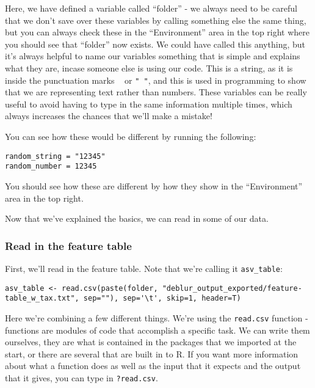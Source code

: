 \documentclass[
]{book}
\begin{document}
Here, we have defined a variable called ``folder'' - we always need to be careful that we don't save over these variables by calling something else the same thing, but you can always check these in the ``Environment'' area in the top right where you should see that ``folder'' now exists. We could have called this anything, but it's always helpful to name our variables something that is simple and explains what they are, incase someone else is using our code. This is a string, as it is inside the punctuation marks \texttt{\textquotesingle{}\ \textquotesingle{}} or \texttt{"\ "}, and this is used in programming to show that we are representing text rather than numbers. These variables can be really useful to avoid having to type in the same information multiple times, which always increases the chances that we'll make a mistake!

You can see how these would be different by running the following:

\begin{verbatim}
random_string = "12345"
random_number = 12345
\end{verbatim}

You should see how these are different by how they show in the ``Environment'' area in the top right.

Now that we've explained the basics, we can read in some of our data.

\subsubsection{Read in the feature table}\label{read-in-the-feature-table}

First, we'll read in the feature table. Note that we're calling it \texttt{asv\_table}:

\begin{verbatim}
asv_table <- read.csv(paste(folder, "deblur_output_exported/feature-table_w_tax.txt", sep=""), sep='\t', skip=1, header=T)
\end{verbatim}

Here we're combining a few different things. We're using the \texttt{read.csv} function - functions are modules of code that accomplish a specific task. We can write them ourselves, they are what is contained in the packages that we imported at the start, or there are several that are built in to R. If you want more information about what a function does as well as the input that it expects and the output that it gives, you can type in \texttt{?read.csv}.
\end{document}
